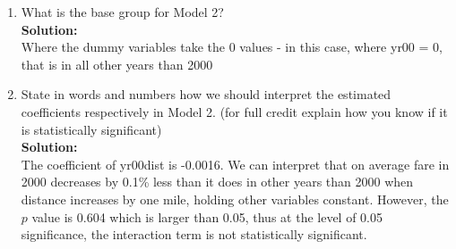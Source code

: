 \documentclass[12pt]{article}
\begin{document}
\begin{enumerate}[(1)]
\item What is the base group for Model 2?
\smallskip\\
{\bf Solution:\\} 
Where the dummy variables take the 0 values - in this case, where yr00 = 0, that is in all other years than 2000



\item State in words and numbers how we should interpret the estimated coeﬃcients respectively in Model 2. (for full credit explain how you know if it is statistically signiﬁcant)
\smallskip\\
{\bf Solution:\\} 
The coefficient of yr00dist is -0.0016. We can interpret that on average fare in 2000 decreases by 0.1\% less than it does in other years than 2000 when distance increases by one mile, holding other variables constant. However, the $p$ value is 0.604 which is larger than 0.05, thus at the level of 0.05 significance, the interaction term is not statistically significant. 




\end{enumerate}
\end{document}
